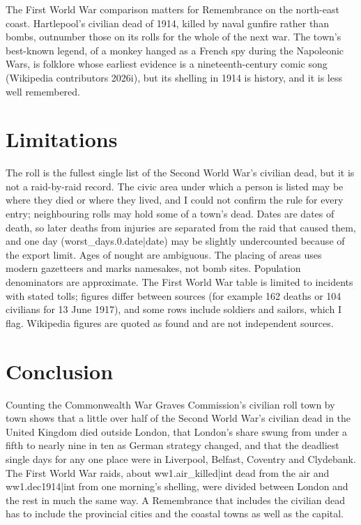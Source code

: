 \documentclass[11pt,a4paper]{article}
\begin{document}
The First World War comparison matters for Remembrance on the north-east coast. Hartlepool's civilian dead of 1914, killed by naval gunfire rather than bombs, outnumber those on its rolls for the whole of the next war. The town's best-known legend, of a monkey hanged as a French spy during the Napoleonic Wars, is folklore whose earliest evidence is a nineteenth-century comic song (Wikipedia contributors 2026i), but its shelling in 1914 is history, and it is less well remembered.

\section{Limitations}

The roll is the fullest single list of the Second World War's civilian dead, but it is not a raid-by-raid record. The civic area under which a person is listed may be where they died or where they lived, and I could not confirm the rule for every entry; neighbouring rolls may hold some of a town's dead. Dates are dates of death, so later deaths from injuries are separated from the raid that caused them, and one day ({{worst_days.0.date|date}}) may be slightly undercounted because of the export limit. Ages of nought are ambiguous. The placing of areas uses modern gazetteers and marks namesakes, not bomb sites. Population denominators are approximate. The First World War table is limited to incidents with stated tolls; figures differ between sources (for example 162 deaths or 104 civilians for 13 June 1917), and some rows include soldiers and sailors, which I flag. Wikipedia figures are quoted as found and are not independent sources.

\section{Conclusion}

Counting the Commonwealth War Graves Commission's civilian roll town by town shows that a little over half of the Second World War's civilian dead in the United Kingdom died outside London, that London's share swung from under a fifth to nearly nine in ten as German strategy changed, and that the deadliest single days for any one place were in Liverpool, Belfast, Coventry and Clydebank. The First World War raids, about {{ww1.air_killed|int}} dead from the air and {{ww1.dec1914|int}} from one morning's shelling, were divided between London and the rest in much the same way. A Remembrance that includes the civilian dead has to include the provincial cities and the coastal towns as well as the capital.
\end{document}
